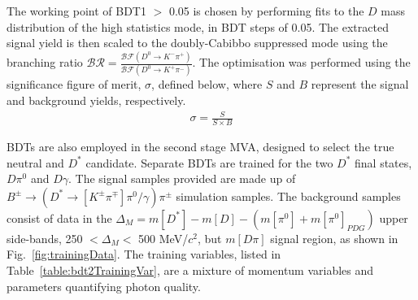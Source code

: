 \documentclass[oneside,12pt]{article}
\begin{document}
The working point of BDT1 $>$ 0.05 is chosen by performing fits to the $D$ mass
distribution of the high statistics mode, in BDT steps of 0.05. The extracted
signal yield is then scaled to the doubly-Cabibbo suppressed mode using the branching ratio
$\mathcal{BR} = \frac{\mathcal{BF}(D^0 \rightarrow K^- \pi^+)}{\mathcal{BF}(D^0
\rightarrow K^+ \pi^-)}$. The optimisation was performed using the significance
figure of merit, $\sigma$, defined below, where $S$ and $B$ represent the signal
and background yields, respectively.
\begin{align}
\sigma = \frac{S}{S \times B}
\label{D_branching_ratio}
\end{align}

BDTs are also employed in the second stage MVA, designed to select the true
neutral and $D^*$ candidate. Separate BDTs are trained for the two $D^*$ final
states, $D\pi^0$ and $D\gamma$. The signal samples provided are made up of
$B^{\pm}\rightarrow (D^*\rightarrow [K^{\pm}\pi^{\mp}]\pi^0/\gamma)\pi^{\pm}$
simulation samples. The background samples consist of data in the
$\Delta_M=m[D^{*}] - m[D]- (m[\pi^0] + m[\pi^0]_{PDG})$ upper side-bands, 250 $
< \Delta_{M} < $ 500 MeV/$c^2$, but $m[D\pi]$ signal region, as shown in
Fig.~\ref{fig:trainingData}. The training variables, listed in
Table~\ref{table:bdt2TrainingVar}, are a mixture of momentum variables and
parameters quantifying photon quality. 
\end{document}
